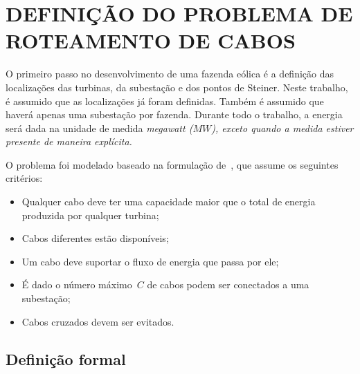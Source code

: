 \chapter{DEFINIÇÃO DO PROBLEMA DE ROTEAMENTO DE CABOS}\label{chap:2}

O primeiro passo no desenvolvimento de uma fazenda eólica é a definição das localizações das turbinas, da subestação e dos pontos de Steiner.
Neste trabalho, é assumido que as localizações já foram definidas.
Também é assumido que haverá apenas uma subestação por fazenda.
Durante todo o trabalho, a energia será dada na unidade de medida \it{megawatt} ($MW$), exceto quando a medida estiver presente de maneira explícita.

O problema foi modelado baseado na formulação de~, que assume os seguintes critérios:~
\begin{itemize}
  \item Qualquer cabo deve ter uma capacidade maior que o total de energia produzida por qualquer turbina;~
  \item Cabos diferentes estão disponíveis;~
  \item Um cabo deve suportar o fluxo de energia que passa por ele;~
  \item É dado o número máximo~$C$ de cabos podem ser conectados a uma subestação;~
  \item Cabos cruzados devem ser evitados.
\end{itemize}

\section{Definição formal}

